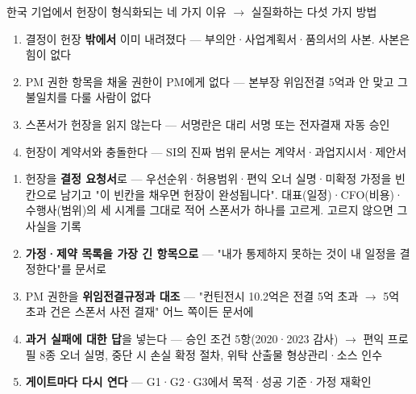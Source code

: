 \begin{frame}[allowframebreaks=1.0]{한국 기업에서 헌장이 형식화되는 네 가지 이유 $\rightarrow$ 실질화하는 다섯 가지 방법}
\small
\par\smallskip{}\nobreak
\begin{enumerate}
\item\relax 결정이 헌장 \textbf{밖에서} 이미 내려졌다 — 부의안·사업계획서·품의서의 사본. 사본은 힘이 없다
\item\relax PM 권한 항목을 채울 권한이 PM에게 없다 — 본부장 위임전결 5억과 안 맞고 그 불일치를 다룰 사람이 없다
\item\relax 스폰서가 헌장을 읽지 않는다 — 서명란은 대리 서명 또는 전자결재 자동 승인
\item\relax 헌장이 계약서와 충돌한다 — SI의 진짜 범위 문서는 계약서·과업지시서·제안서
\end{enumerate}
\par\smallskip{}\nobreak
\begin{enumerate}
\item\relax 헌장을 \textbf{결정 요청서}로 — 우선순위·허용범위·편익 오너 실명·미확정 가정을 빈칸으로 남기고 "이 빈칸을 채우면 헌장이 완성됩니다". 대표(일정)·CFO(비용)·수행사(범위)의 세 시계를 그대로 적어 스폰서가 하나를 고르게. 고르지 않으면 그 사실을 기록
\item\relax \textbf{가정·제약 목록을 가장 긴 항목으로} — "내가 통제하지 못하는 것이 내 일정을 결정한다"를 문서로
\item\relax PM 권한을 \textbf{위임전결규정과 대조} — "컨틴전시 10.2억은 전결 5억 초과 $\rightarrow$ 5억 초과 건은 스폰서 사전 결재" 어느 쪽이든 문서에
\item\relax \textbf{과거 실패에 대한 답}을 넣는다 — 승인 조건 5항(2020·2023 감사) $\rightarrow$ 편익 프로필 8종 오너 실명, 중단 시 손실 확정 절차, 위탁 산출물 형상관리·소스 인수
\item\relax \textbf{게이트마다 다시 연다} — G1·G2·G3에서 목적·성공 기준·가정 재확인
\end{enumerate}
\end{frame}

